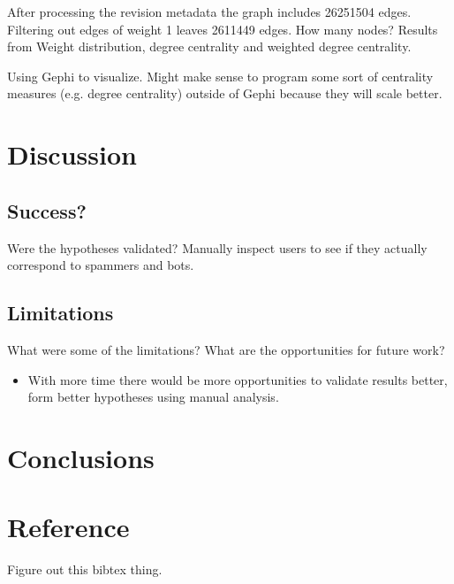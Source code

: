 \documentclass{article}
\begin{document}
After processing the revision metadata the graph includes 26251504 edges. Filtering out edges of weight 1 leaves 2611449 edges. How many nodes? Results from Weight distribution, degree centrality and weighted degree centrality.

Using Gephi to visualize. Might make sense to program some sort of centrality measures (e.g. degree centrality) outside of Gephi because they will scale better.

\section{Discussion}
\subsection{Success?}
Were the hypotheses validated? Manually inspect users to see if they actually correspond to spammers and bots.
\subsection{Limitations}
What were some of the limitations? What are the opportunities for future work?
\begin{itemize}
\item With more time there would be more opportunities to validate results better, form better hypotheses using manual analysis.
\end{itemize}
\section{Conclusions}
\section{Reference}
Figure out this bibtex thing.
\end{document}
